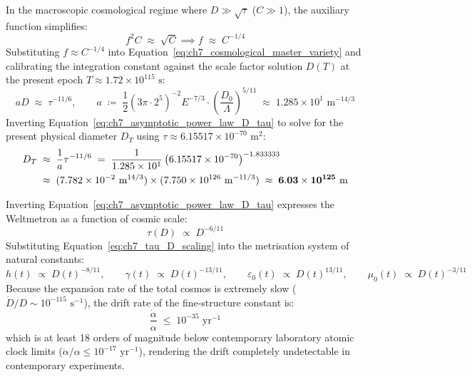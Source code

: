 \documentclass[
    12pt,
    a4paper,
    headings=normal,
    twoside=false,
    open=any,
    parskip=half
]{scrbook}
\begin{document}
In the macroscopic cosmological regime where $D \gg \sqrt{\tau}$ ($C \gg 1$), the auxiliary function simplifies:
\begin{equation}
f^2 C \;\approx\; \sqrt{C} \implies f \;\approx\; C^{-1/4}
\end{equation}
Substituting $f \approx C^{-1/4}$ into Equation~\eqref{eq:ch7_cosmological_master_variety} and calibrating the integration constant against the scale factor solution $D(T)$ at the present epoch $T \approx 1.72 \times 10^{115}\text{ s}$:
\begin{equation}
a D \;\approx\; \tau^{-11/6}, \qquad a \;\coloneqq\; \frac{1}{2}\left( 3\pi \cdot 2^5 \right)^{-2} E^{-7/3} \cdot \left( \frac{D_0}{\Lambda} \right)^{5/11} \;\approx\; 1.285 \times 10^1 \text{ m}^{-14/3}
\label{eq:ch7_asymptotic_power_law_D_tau}
\end{equation}
Inverting Equation~\eqref{eq:ch7_asymptotic_power_law_D_tau} to solve for the present physical diameter $D_T$ using $\tau \approx 6.15517 \times 10^{-70}\text{ m}^2$:
\begin{align}
D_T &\;\approx\; \frac{1}{a} \tau^{-11/6} \;=\; \frac{1}{1.285 \times 10^1} \left( 6.15517 \times 10^{-70} \right)^{-1.833333} \notag \\
&\;\approx\; (7.782 \times 10^{-2} \text{ m}^{14/3}) \times (7.750 \times 10^{126} \text{ m}^{-11/3}) \;\approx\; \mathbf{6.03 \times 10^{125} \text{ m}}
\label{eq:ch7_present_cosmic_diameter}
\end{align}

\begin{physscholion}\label{sch:ch7_secular_drift_constants}
Inverting Equation~\eqref{eq:ch7_asymptotic_power_law_D_tau} expresses the Weltmetron as a function of cosmic scale:
\begin{equation}
\tau(D) \;\propto\; D^{-6/11}
\label{eq:ch7_tau_D_scaling}
\end{equation}
Substituting Equation~\eqref{eq:ch7_tau_D_scaling} into the metrisation system of natural constants:
\begin{equation}
h(t) \;\propto\; D(t)^{-8/11}, \qquad \gamma(t) \;\propto\; D(t)^{-13/11}, \qquad \varepsilon_0(t) \;\propto\; D(t)^{13/11}, \qquad \mu_0(t) \;\propto\; D(t)^{-3/11}
\label{eq:ch7_constants_drift_proportionalities}
\end{equation}
Because the expansion rate of the total cosmos is extremely slow ($\dot{D}/D \sim 10^{-115}\text{ s}^{-1}$), the drift rate of the fine-structure constant is:
\begin{equation}
\frac{\dot{\alpha}}{\alpha} \;\le\; 10^{-35} \text{ yr}^{-1}
\end{equation}
which is at least 18 orders of magnitude below contemporary laboratory atomic clock limits ($\dot{\alpha}/\alpha \le 10^{-17}\text{ yr}^{-1}$), rendering the drift completely undetectable in contemporary experiments.
\end{physscholion}
\end{document}
